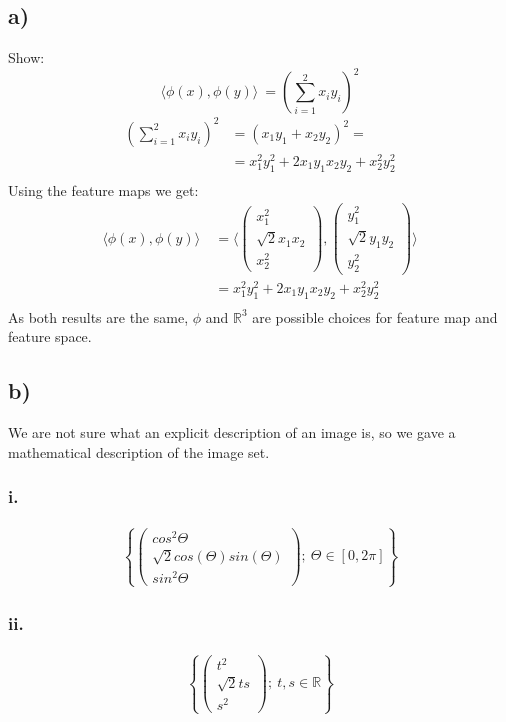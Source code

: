 \documentclass{article}
\newcommand{\R}[0]{\mathbb{R}}
\begin{document}
\subsection*{a)}
Show:
\begin{equation}
    \langle{}\phi(x), \phi(y)\rangle{}~= \left(\sum_{i=1}^2 x_i y_i \right)^2
\end{equation}
\begin{align}
    \left(\sum_{i=1}^2 x_i y_i \right)^2 &= \left(x_1 y_1 + x_2 y_2 \right)^2 = \\
    & = x_1^2 y_1^2 + 2 x_1 y_1 x_2 y_2 + x_2^2 y_2^2  \\
\end{align}
Using the feature maps we get:
\begin{align}
    \langle{}\phi(x), \phi(y)\rangle{}~ &= \langle{}
        \begin{pmatrix}x_1^2 \\ \sqrt{2} x_1 x_2 \\ x_2^2 \end{pmatrix},
        \begin{pmatrix}y_1^2 \\ \sqrt{2} y_1 y_2 \\ y_2^2 \end{pmatrix} \rangle{} \\
    & = x_1^2 y_1^2 + 2 x_1 y_1 x_2 y_2 + x_2^2 y_2^2  \\
\end{align}
As both results are the same, $\phi$ and $\R^3$ are possible choices for feature map
and feature space.

\subsection*{b)}
We are not sure what an explicit description of an image is, so we gave a mathematical description of the image set. 
\subsubsection*{i.}
\begin{gather*}
\left\{ \left( \begin{array}{c}cos^2 \Theta \\ \sqrt{2} cos(\Theta) sin(\Theta) \\ sin^2 \Theta \end{array} \right); \ \Theta \in [0, 2\pi] \right\}
\end{gather*}
\subsubsection*{ii.}
\begin{gather*}
\left\{ \left( \begin{array}{c}t^2 \\ \sqrt{2} t s \\ s^2 \end{array} \right); \ t,s \in \R \right\} 
\end{gather*}
\end{document}

